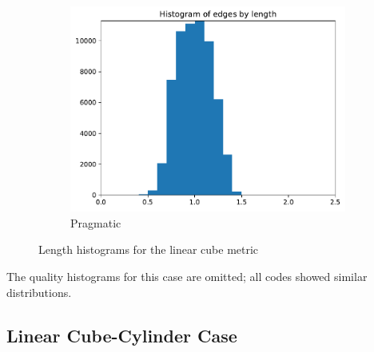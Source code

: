 \documentclass[3p,times,procedia,number]{elsarticle}
\begin{document}
\begin{figure}
\begin{subfigure}{.16\textwidth}
\includegraphics[width=\textwidth]{pragmatic-cube-linear-length.pdf}
\caption{Pragmatic}
\end{subfigure}
\caption{Length histograms for the linear cube metric}
\label{fig:cube-linear-lengths}
\end{figure}
The quality histograms for this case are omitted;
all codes showed similar distributions.

\subsection{Linear Cube-Cylinder Case}
\end{document}

